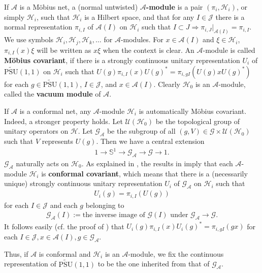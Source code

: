 \documentclass[12pt,a4paper,notitlepage]{article}
\theoremstyle{definition}
\theoremstyle{plain}
\newcommand{\mc}{\mathcal}
\newcommand{\GA}{\mathscr G_{\mathcal A}}
\newcommand{\scr}{\mathscr}
\newcommand{\UPSU}{\widetilde{\mathrm{PSU}}(1,1)}
\newcommand{\Sbb}{{\mathbb S}}
\numberwithin{equation}{section}
\begin{document}
If $\mc A$ is a M\"obius net, a (normal untwisted) \textbf{$\mc A$-module} is a pair $(\pi_i,\mc H_i)$, or simply $\mc H_i$, such that $\mc H_i$ is a Hilbert space, and that for any $I\in\mc J$ there is a normal  representation $\pi_{i,I}$ of $\mc A(I)$ on $\mc H_i$ such that $I\subset J\Rightarrow \pi_{i,J}|_{\mc A(I)}=\pi_{i,I}$. We use symbols $\mc H_i,\mc H_j,\mc H_k,\dots$ for $\mc A$-modules. For $x\in\mc A(I)$ and $\xi\in\mc H_i$, $\pi_{i,I}(x)\xi$ will be written as $x\xi$ when the context is clear. An $\mc A$-module is called \textbf{M\"obius covariant}, if there is a strongly continuous unitary representation $U_i$ of $\UPSU$ on $\mc H_i$ such that $U(g)\pi_{i,I}(x)U(g)^*=\pi_{i,gI}(U(g)xU(g)^*)$ for each $g\in\UPSU$, $I\in\mc J$, and $x\in\mc A(I)$. Clearly $\mc H_0$ is an $\mc A$-module, called the \textbf{vacuum module} of $\mc A$.

If $\mc A$ is a conformal net, any $\mc A$-module $\mc H_i$ is automatically M\"obius covariant. Indeed, a stronger property holds. Let $\mc U(\mc H_0)$ be the topological group of unitary operators on $\mc H$. Let $\GA$ be the subgroup of all $(g,V)\in\scr G\times\mc U(\mc H_0)$ such that $V$ represents $U(g)$. Then we have a central extension
\begin{align*}
	1\rightarrow \Sbb^1\rightarrow \GA\rightarrow\scr G\rightarrow 1.
\end{align*}
$\GA$ naturally acts on $\mc H_0$. As explained in \cite[Thm. 2.2]{Gui21a}, the results in \cite{Hen19} imply that   each $\mc A$-module $\mc H_i$ is \textbf{conformal covariant}, which means that there is a (necessarily unique) strongly continuous unitary representation $U_i$ of $\GA$ on $\mc H_i$ such that
\begin{align}
U_i(g)=\pi_{i,I}(U(g))	\label{eq1}
\end{align}
for each $I\in\mc J$ and each $g$ belonging to 
\begin{align*}
\GA(I):=\text{the inverse image of $\scr G(I)$ under $\GA\rightarrow\scr G$}.	
\end{align*}
It follows easily (cf. the proof of \cite[Cor. 2.6]{Gui21a}) that   $U_i(g)\pi_{i,I}(x)U_i(g)^*=\pi_{i,gI}(gx)$ for each $I\in\mc J,x\in\mc A(I),g\in\GA$.
 

Thus, if $\mc A$ is conformal and $\mc H_i$ is an $\mc A$-module, we fix the continuous representation of $\UPSU$ to be the one inherited from that of $\GA$.  
\end{document}
